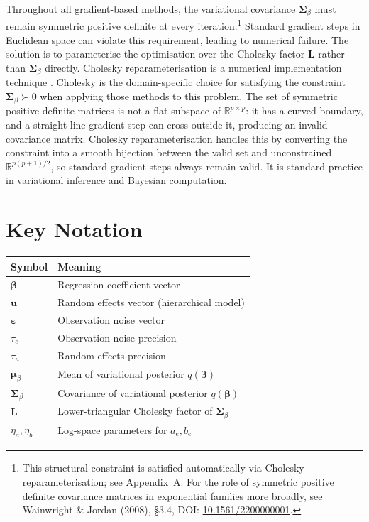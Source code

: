 \documentclass[11pt]{article}
\newcommand{\R}{\mathbb{R}}
\begin{document}
Throughout all gradient-based methods, the variational covariance $\bm{\Sigma}_\beta$ must remain symmetric positive definite at every iteration.\footnote{This structural constraint is satisfied automatically via Cholesky reparameterisation; see Appendix~A. For the role of symmetric positive definite covariance matrices in exponential families more broadly, see Wainwright \& Jordan (2008), \S3.4, DOI: \href{https://doi.org/10.1561/2200000001}{10.1561/2200000001}.} Standard gradient steps in Euclidean space can violate this requirement, leading to numerical failure.
 The solution is to parameterise the optimisation over the Cholesky factor $\bm{L}$ rather than $\bm{\Sigma}_\beta$ directly.
 Cholesky reparameterisation is a numerical implementation technique .   Cholesky is the domain-specific choice for satisfying the constraint $\bm{\Sigma}_\beta \succ 0$ when applying those methods to this problem. The set of symmetric positive definite matrices is not a flat subspace of $\R^{p \times p}$: it has a curved boundary, and a straight-line gradient step can cross outside it, producing an invalid covariance matrix. Cholesky reparameterisation handles this by converting the constraint into a smooth bijection between the valid set and unconstrained $\R^{p(p+1)/2}$, so standard gradient steps always remain valid. It is standard practice in variational inference and Bayesian computation.


\section*{Key Notation}

\begin{center}
\begin{tabular}{ll}
\hline
Symbol & Meaning \\
\hline
$\bm{\beta}$ & Regression coefficient vector \\
$\bm{u}$ & Random effects vector (hierarchical model) \\
$\bm{\varepsilon}$ & Observation noise vector \\
$\tau_e$ & Observation-noise precision \\
$\tau_u$ & Random-effects precision \\
$\bm{\mu}_\beta$ & Mean of variational posterior $q(\bm{\beta})$ \\
$\bm{\Sigma}_\beta$ & Covariance of variational posterior $q(\bm{\beta})$ \\
$\bm{L}$ & Lower-triangular Cholesky factor of $\bm{\Sigma}_\beta$ \\
$\eta_a, \eta_b$ & Log-space parameters for $a_e, b_e$ \\
\hline
\end{tabular}
\end{center}
\newpage
\end{document}
